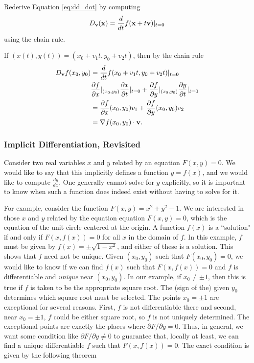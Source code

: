 \documentclass[12pt,letterpaper,reqno]{article}
\numberwithin{equation}{section}
\newcommand{\bv}{{\bf v}}
\newcommand{\bx}{{\bf x}}
\begin{document}
{\begin{exercise}
Rederive Equation \eqref{eq:dd_dot} by computing
\begin{align*}
	D_\bv(\bx)=\frac{d}{dt}f(\bx+t\bv)|_{t=0}
\end{align*}	
using the chain rule.
\end{exercise}

{\color{red}
\begin{solution}
If $(x(t),y(t))=(x_0+v_1t,y_0+v_2t)$, then by the chain rule
\begin{align*}
	D_\bv f(x_0,y_0)&=\frac{d}{dt}f(x_0+v_1t,y_0+v_2t)|_{t=0} \\
	&\frac{\partial f}{\partial x}|_{(x_0,y_0)}\frac{\partial x}{\partial t}|_{t=0}+\frac{\partial f}{\partial y}|_{(x_0,y_0)}\frac{\partial y}{\partial t}|_{t=0} \\
	&=\frac{\partial f}{\partial x}(x_0,y_0)v_1+\frac{\partial f}{\partial y}(x_0,y_0)v_2 \\
	&=\nabla f(x_0,y_0) \cdot \bv.
\end{align*}	
\end{solution}
}

\subsubsection{Implicit Differentiation, Revisited}
Consider two real variables $x$ and $y$ related by an equation $F(x,y)=0$. We would like to say that this implicitly defines a function $y=f(x)$, and we would like to compute $\frac{dy}{dx}$. One generally cannot solve for $y$ explicitly, so it is important to know when such a function does indeed exist without having to solve for it.


For example, consider the function $F(x,y)=x^2+y^2-1$. We are interested in those $x$ and $y$ related by the equation equation $F(x,y)=0$, which is the equation of the unit circle centered at the origin. A function $f(x)$ is a ``solution" if and only if $F(x,f(x))=0$ for all $x$ in the domain of $f$. In this example, $f$ must be given by $f(x)=\pm \sqrt{1-x^2}$, and either of these is a solution. This shows that $f$ need not be unique. Given $(x_0,y_0)$ such that $F(x_0,y_0)=0$, we would like to know if we can find $f(x)$ such that $F(x,f(x))=0$ and $f$ is differentiable and \emph{unique} near $(x_0,y_0)$. In our example, if $x_0 \neq \pm 1$, then this is true if $f$ is taken to be the appropriate square root. The (sign of the) given $y_0$ determines which square root must be selected. The points $x_0=\pm 1$ are exceptional for several reasons. First, $f$ is not differentiable there and second, near $x_0=\pm 1$, $f$ could be either square root, so $f$ is not uniquely determined. The exceptional points are exactly the places where $\partial F/\partial y=0$. Thus, in general, we want some condition like $\partial F/\partial y \neq 0$ to guarantee that, locally at least, we can find a unique differentiable $f$ such that $F(x,f(x))=0$. The exact condition is given by the following theorem

}
\end{document}
